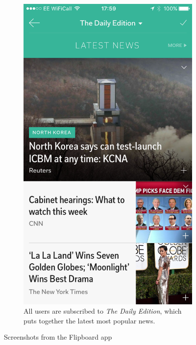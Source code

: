 \documentclass[12pt]{article}
\begin{document}
\begin{figure}[H]
\begin{subfigure}[t]{0.3\textwidth}
        \label{FlipboardHome}
    \end{subfigure}
    \qquad
    \begin{subfigure}[t]{0.3\textwidth}
    \includegraphics[width=\textwidth]{Flipboard.PNG}
   \caption{All users are subscribed to \emph{The Daily Edition}, which puts together the latest most popular news.}
   \label{FlipboardDailyEdition}
   \end{subfigure}
   \caption[Screenshots from the Flipboard app]{Screenshots from the Flipboard app}
\end{figure}
\end{document}
